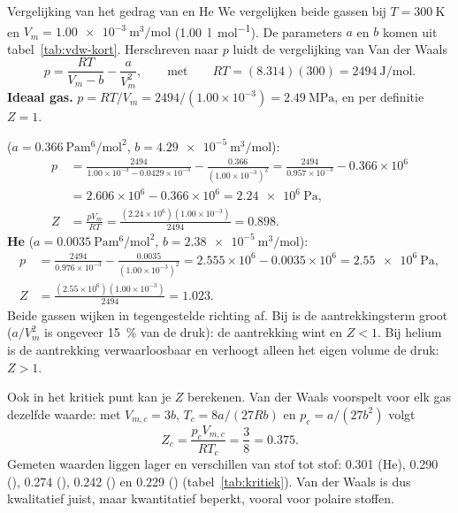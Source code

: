 \begin{voorbeeld}{Vergelijking van het gedrag van  en He}
We vergelijken beide gassen bij $T = \SI{300}{\kelvin}$ en $V_m = \SI{1.00e-3}{\metre\cubed\per\mole}$ (\SI{1.00}{\litre\per\mole}). De parameters $a$ en $b$ komen uit tabel~\ref{tab:vdw-kort}. Herschreven naar $p$ luidt de vergelijking van Van der Waals
\[
p = \frac{RT}{V_m - b} - \frac{a}{V_m^2},
\qquad\text{met}\qquad RT = (8.314)(300) = \SI{2494}{\joule\per\mole}.
\]
\textbf{Ideaal gas.} $p = RT/V_m = 2494/(1.00\times10^{-3}) = \SI{2.49}{\mega\pascal}$, en per definitie $Z = 1$.

\textbf{} ($a = \SI{0.366}{\pascal\metre\tothe{6}\per\mole\squared}$, $b = \SI{4.29e-5}{\metre\cubed\per\mole}$):
\begin{align*}
p &= \frac{2494}{1.00\times10^{-3} - 0.0429\times10^{-3}} - \frac{0.366}{(1.00\times10^{-3})^2}
   = \frac{2494}{0.957\times10^{-3}} - 0.366\times10^{6}\\
  &= 2.606\times10^{6} - 0.366\times10^{6} = \SI{2.24e6}{\pascal},\\
Z &= \frac{pV_m}{RT} = \frac{(2.24\times10^{6})(1.00\times10^{-3})}{2494} = 0.898.
\end{align*}
\textbf{He} ($a = \SI{0.0035}{\pascal\metre\tothe{6}\per\mole\squared}$, $b = \SI{2.38e-5}{\metre\cubed\per\mole}$):
\begin{align*}
p &= \frac{2494}{0.976\times10^{-3}} - \frac{0.0035}{(1.00\times10^{-3})^2}
   = 2.555\times10^{6} - 0.0035\times10^{6} = \SI{2.55e6}{\pascal},\\
Z &= \frac{(2.55\times10^{6})(1.00\times10^{-3})}{2494} = 1.023.
\end{align*}
Beide gassen wijken in tegengestelde richting af. Bij  is de aantrekkingsterm groot ($a/V_m^2$ is ongeveer \SI{15}{\percent} van de druk): de aantrekking wint en $Z < 1$. Bij helium is de aantrekking verwaarloosbaar en verhoogt alleen het eigen volume de druk: $Z > 1$.
\end{voorbeeld}

Ook in het kritiek punt kan je $Z$ berekenen. Van der Waals voorspelt voor elk gas dezelfde waarde: met $V_{m,c} = 3b$, $T_c = 8a/(27Rb)$ en $p_c = a/(27b^2)$ volgt
\[
Z_c = \frac{p_c V_{m,c}}{RT_c} = \frac{3}{8} = 0.375.
\]
Gemeten waarden liggen lager en verschillen van stof tot stof: 0.301 (He), 0.290 (), 0.274 (), 0.242 () en 0.229 () (tabel~\ref{tab:kritiek}). Van der Waals is dus kwalitatief juist, maar kwantitatief beperkt, vooral voor polaire stoffen.

